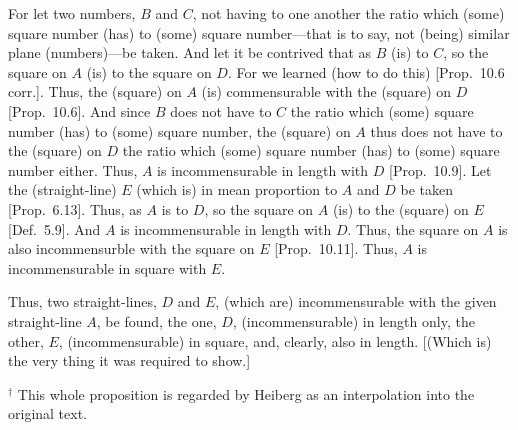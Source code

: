 \begin{Parallel}{}{}
{For let two numbers, $B$ and $C$,  not having to one another
the ratio which (some) square number (has) to (some) square number---that
is to say, not (being) similar plane (numbers)---be taken. And let it be contrived
that as $B$ (is) to $C$, so the square on $A$ (is) to the square on $D$.
For we learned (how to do this) [Prop.~10.6 corr.].
Thus, the (square) on $A$ (is) commensurable with the (square) on $D$
[Prop.~10.6]. And since $B$ does not have to $C$ the
ratio which (some) square number (has) to (some) square number, the
(square) on $A$ thus does not have to the (square) on $D$ the ratio which (some) square number (has) to (some) square number either. Thus, $A$ is
incommensurable in length with $D$ [Prop.~10.9].
Let the (straight-line) $E$ (which is) in mean proportion to $A$ and $D$ 
be taken [Prop.~6.13]. Thus, as $A$ is to $D$, so the square on $A$ (is) to the (square)
on $E$ [Def.~5.9]. And $A$ is incommensurable in length with $D$. Thus, the square on $A$ is also incommensurble
with the square on $E$ [Prop.~10.11]. 
Thus, $A$ is incommensurable in square with $E$.

Thus, two straight-lines, $D$ and $E$, (which are) incommensurable with the given
straight-line $A$, be found, the one, $D$, (incommensurable)
in length only, the other, $E$, (incommensurable) in square, and, clearly, also in length. [(Which is) the very thing it was required to show.]}
\end{Parallel}
{\footnotesize\noindent$^\dag$ This whole proposition is regarded by Heiberg as an interpolation into the original text.}

